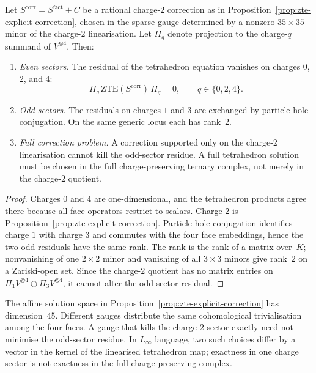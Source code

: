\begin{proposition}
\label{prop:zte-o-kappa4}
Let $S^{\mathrm{corr}}=S^{\mathrm{fact}}+C$ be a rational charge-$2$ correction as in Proposition~\textup{\ref{prop:zte-explicit-correction}}, chosen in the sparse gauge determined by a nonzero $35\times35$ minor of the charge-$2$ linearisation. Let $\Pi_q$ denote projection to the charge-$q$ summand of $V^{\otimes4}$. Then:
\begin{enumerate}[label=\textup{(\roman*)}]
 \item \emph{Even sectors.} The residual of the tetrahedron equation vanishes on charges $0$, $2$, and $4$:
 \[
 \Pi_q\,\mathrm{ZTE}(S^{\mathrm{corr}})\,\Pi_q=0,
 \qquad q\in\{0,2,4\}.
 \]
 \item \emph{Odd sectors.} The residuals on charges $1$ and $3$ are exchanged by particle-hole conjugation. On the same generic locus each has rank~$2$.
 \item \emph{Full correction problem.} A correction supported only on the charge-$2$ linearisation cannot kill the odd-sector residue. A full tetrahedron solution must be chosen in the full charge-preserving ternary complex, not merely in the charge-$2$ quotient.
\end{enumerate}
\end{proposition}

\begin{proof}
Charges $0$ and $4$ are one-dimensional, and the tetrahedron products agree there because all face operators restrict to scalars. Charge $2$ is Proposition~\ref{prop:zte-explicit-correction}. Particle-hole conjugation identifies charge $1$ with charge $3$ and commutes with the four face embeddings, hence the two odd residuals have the same rank. The rank is the rank of a matrix over~$K$; nonvanishing of one $2\times2$ minor and vanishing of all $3\times3$ minors give rank~$2$ on a Zariski-open set. Since the charge-$2$ quotient has no matrix entries on $\Pi_1V^{\otimes4}\oplus\Pi_3V^{\otimes4}$, it cannot alter the odd-sector residual.
\end{proof}

\begin{remark}
\label{rem:zte-gauge-orbit}
The affine solution space in Proposition~\ref{prop:zte-explicit-correction} has dimension~$45$. Different gauges distribute the same cohomological trivialisation among the four faces. A gauge that kills the charge-$2$ sector exactly need not minimise the odd-sector residue. In $L_\infty$ language, two such choices differ by a vector in the kernel of the linearised tetrahedron map; exactness in one charge sector is not exactness in the full charge-preserving complex.
\end{remark}

